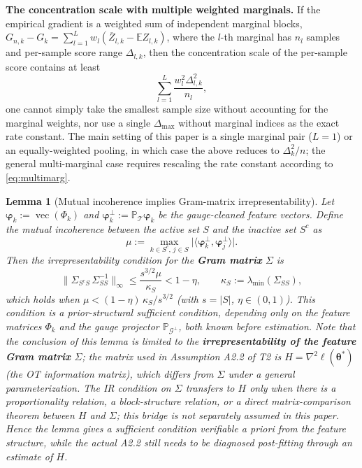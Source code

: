 \documentclass[11pt,a4paper]{article}
\newtheorem{lemma}[theorem]{Lemma}
\theoremstyle{remark}
\renewcommand{\phi}{\bm{\varphi}}
\begin{document}
\textbf{The concentration scale with multiple weighted marginals.} If the empirical
gradient is a weighted sum of independent marginal blocks,
$G_{n,k}-G_k=\sum_{l=1}^{L}w_l(\overline Z_{l,k}-\mathbb E Z_{l,k})$, where the $l$-th
marginal has $n_l$ samples and per-sample score range $\Delta_{l,k}$, then the
concentration scale of the per-sample score contains at least
\begin{equation}\label{eq:multimarg}
\sum_{l=1}^{L}\frac{w_l^2\Delta_{l,k}^2}{n_l},
\end{equation}
one cannot simply take the smallest sample size without accounting for the marginal
weights, nor use a single $\Delta_{\max}$ without marginal indices as the exact rate
constant. The main setting of this paper is a single marginal pair ($L=1$) or an
equally-weighted pooling, in which case the above reduces to $\Delta_{k}^2/n$; the general
multi-marginal case requires rescaling the rate constant according to \eqref{eq:multimarg}.

\begin{lemma}[Mutual incoherence implies Gram-matrix irrepresentability]\label{lem:mutual_incoherence}
Let $\phi_k:=\operatorname{vec}(\Phi_k)$ and
$\phi_k^{\perp}:=\mathbb{P}_{\mathcal{T}}\phi_k$ be the gauge-cleaned feature vectors.
Define the mutual incoherence between the active set $S$ and the inactive set $S^c$ as
\[
\mu:=\max_{k\in S^c,\,j\in S}\bigl|\langle\phi_k^{\perp},\phi_j^{\perp}\rangle\bigr|.
\]
Then the irrepresentability condition for the \textbf{Gram matrix} $\Sigma$ is
\[
\bigl\|\Sigma_{S^cS}\,\Sigma_{SS}^{-1}\bigr\|_{\infty}
\le\frac{s^{3/2}\mu}{\kappa_S}
<1-\eta,
\qquad
\kappa_S:=\lambda_{\min}(\Sigma_{SS}),
\]
which holds when $\mu<(1-\eta)\,\kappa_S/s^{3/2}$ (with $s=|S|$, $\eta\in(0,1)$). This
condition is a prior-structural sufficient condition, depending only on the feature
matrices $\Phi_k$ and the gauge projector $\mathbb{P}_{\mathcal{G}^{\perp}}$, both known
before estimation. Note that the conclusion of this lemma is limited to the
\textbf{irrepresentability of the feature Gram matrix $\Sigma$}; the matrix used in
Assumption A2.2 of T2 is $H=\nabla^2\ell(\bm{\theta}^*)$ (the OT information matrix),
which differs from $\Sigma$ under a general parameterization. The IR condition on $\Sigma$
transfers to $H$ only when there is a proportionality relation, a block-structure relation,
or a direct matrix-comparison theorem between $H$ and $\Sigma$; this bridge is not
separately assumed in this paper. Hence the lemma gives a sufficient condition verifiable a
priori from the feature structure, while the actual A2.2 still needs to be diagnosed
post-fitting through an estimate of $H$.
\end{lemma}
\end{document}

